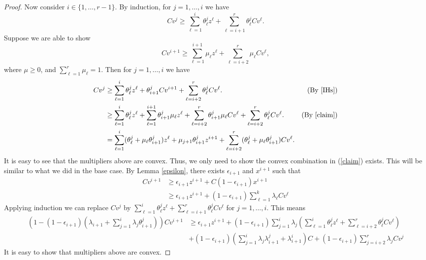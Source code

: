\begin{proof}
{	Now consider $i\in \{1,\ldots,r-1\}$. By induction, for $j=1,\ldots,i$ we have
	\begin{equation}\label{IHs}
	Cv^j \geq  \sum_{\ell=1}^{i} \theta^{j}_\ell z^\ell + \sum_{\ell=i+1}^{r}\theta^{j}_{\ell}Cv^\ell.
	\end{equation}
	Suppose we are able to show 
	\begin{equation}\label{claim} 
	Cv^{i+1} \geq \sum_{\ell=1}^{i+1} \mu_\ell z^\ell + \sum_{\ell=i+2}^{r}\mu_{\ell}Cv^\ell,\end{equation} 
	where $\mu\geq 0$, and $\sum_{\ell=1}^{r}\mu_{\ell}=1$. Then for $j=1,\ldots,i$ we have
	\begin{align*}
		Cv^j& \geq \sum_{\ell=1}^{i} \theta^{j}_\ell z^\ell +\theta^{j}_{i+1}Cv^{i+1}+  \sum_{\ell=i+2}^{r}\theta^{j}_{\ell}Cv^\ell.& (\mbox{By } \ref{IHs})\\
		& \geq \sum_{\ell=1}^{i} \theta^{j}_\ell z^\ell +\sum_{\ell=1}^{i+1}\theta^{j}_{i+1}\mu_\ell z^\ell+ \sum_{\ell=i+2}^{r}\theta^j_{i+1}\mu_{\ell}Cv^\ell +   \sum_{\ell=i+2}^{r}\theta^{j}_{\ell}Cv^\ell.& (\mbox{By } \ref{claim})\\
		&= \sum_{\ell=1}^{i} (\theta^j_\ell+\mu_{\ell}\theta^j_{i+1}) z^\ell + \mu_{j+1}\theta^j_{i+1}z^{i+1} + \sum_{\ell=i+2}^{r} (\theta^j_\ell+\mu_\ell\theta^j_{i+1})Cv^\ell.&
	\end{align*} 
	It is easy to see that the multipliers above are convex. Thus, we only need to show the convex combination in (\ref{claim}) exists. This will be similar to what we did in the base case. By Lemma \ref{epsilon}, there exists $\epsilon_{i+1}$ and $x^{i+1}$ such that
	\begin{align*}
		Cv^{i+1}&\geq \epsilon_{i+1}z^{i+1}+ C(1-\epsilon_{i+1})x^{i+1}\\
		&\geq \epsilon_{i+1}z^{i+1}+ (1-\epsilon_{i+1})\sum_{\ell=1}^{k}\lambda_{\ell}Cv^\ell
	\end{align*}
	Applying induction we can replace $Cv^j$ by $ \sum_{\ell=1}^{i} \theta^{j}_\ell z^\ell + \sum_{\ell=i+1}^{r}\theta^{j}_{\ell}Cv^\ell$ for $j=1,\ldots,i$. 
	This means
	\begin{align*}
		(1-(1-\epsilon_{i+1})(\lambda_{i+1}+\sum_{j=1}^{i}\lambda_j\theta^j_{i+1}))Cv^{i+1}&\geq \epsilon_{i+1}z^{i+1}+(1-\epsilon_{i+1})\sum_{j=1}^{i}\lambda_j (\sum_{\ell=1}^{i}\theta^j_\ell z^\ell+ \sum_{\ell=i+2}^{r}\theta^j_\ell Cv^\ell)\\
		&+(1-\epsilon_{i+1})(\sum_{j=1}^{i}\lambda_j \lambda^j_{i+1}+\lambda^i_{i+1})C+ (1-\epsilon_{i+1})\sum_{j=i+2}^{r}\lambda_jCv^{j} 
	\end{align*}
	It is easy to show that  multipliers above are convex.}\fi
\end{proof}

